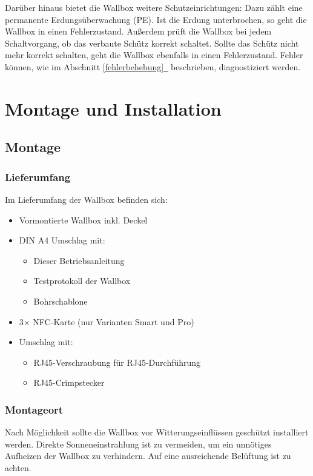 \documentclass[a4paper,10pt]{article}
\newcommand*{\fullref}[1]{\hyperref[{#1}]{\ref*{#1}~\nameref*{#1}}}
\begin{document}
\begin{multicols*}{2}
	Darüber hinaus bietet die Wallbox weitere Schutzeinrichtungen: Dazu zählt eine
	permanente Erdungsüberwachung (PE). Ist die Erdung unterbrochen, so geht die
	Wallbox in einen Fehlerzustand. Außerdem prüft die Wallbox bei jedem
	Schaltvorgang, ob das verbaute Schütz korrekt schaltet. Sollte das
	Schütz nicht mehr korrekt schalten, geht die Wallbox ebenfalls in einen Fehlerzustand.
	Fehler können, wie im Abschnitt \fullref{fehlerbehebung} beschrieben, diagnostiziert werden.

	\newpage
	\section{Montage und Installation}
	\subsection{Montage}
	\subsubsection{Lieferumfang}
	Im Lieferumfang der Wallbox befinden sich:
	\begin{itemize}
		\item Vormontierte Wallbox inkl. Deckel
		\item DIN A4 Umschlag mit:
		\begin{itemize}
			\item Dieser Betriebsanleitung
			\item Testprotokoll der Wallbox
			\item Bohrschablone
		\end{itemize}
		\item 3$\times$ NFC-Karte (nur Varianten Smart und Pro)
		\item Umschlag mit:
		\begin{itemize}
			\item RJ45-Verschraubung für RJ45-Durchführung
			\item RJ45-Crimpstecker
		\end{itemize}
	\end{itemize}

	\subsubsection{Montageort}
	Nach Möglichkeit sollte die Wallbox vor Witterungseinflüssen geschützt
	installiert werden. Direkte Sonneneinstrahlung ist zu vermeiden, um ein
	unnötiges Aufheizen der Wallbox zu verhindern. Auf eine ausreichende Belüftung
	ist zu achten.


\end{multicols*}
\end{document}
